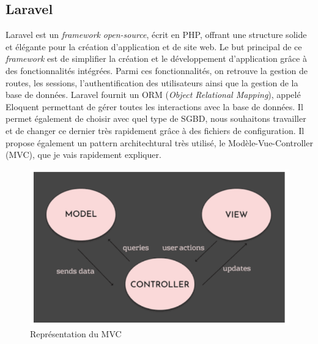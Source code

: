 \subsection{Laravel}
Laravel est un \emph{framework} \emph{open-source}, écrit en PHP, offrant une structure solide et élégante pour la création d'application et de site web. Le but principal de ce \emph{framework} est de simplifier la création et le développement d'application grâce à des fonctionnalités intégrées. Parmi ces fonctionnalités, on retrouve la gestion de routes, les sessions, l'authentification des utilisateurs ainsi que la gestion de la base de données.
Laravel fournit un ORM (\emph{Object Relational Mapping}), appelé Eloquent permettant de gérer toutes les interactions avec la base de données. Il permet également de choisir avec quel type de SGBD, nous souhaitons travailler et de changer ce dernier très rapidement grâce à des fichiers de configuration.
Il propose également un pattern architechtural très utilisé, le Modèle-Vue-Controller (MVC), que je vais rapidement expliquer.
\begin{center}
    \begin{figure}[H]
        \includegraphics[width=\textwidth]{./assets/figures/MVCExplanation.png}
        \caption{Représentation du MVC \label{MVCExplanation.png}}
    \end{figure}
\end{center}

